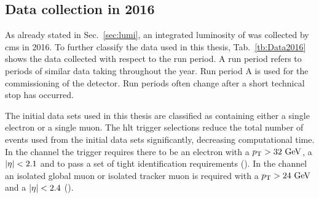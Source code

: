 
\subsection{Data collection in 2016} %
\label{sub:data_collection_in_2016}

As already stated in Sec.~\ref{sec:lumi}, an integrated luminosity of \Lumi{} was collected by \acrshort{cms} in 2016.
To further classify the data used in this thesis, Tab.~\ref{tb:Data2016} shows the data collected with respect to the run period.
A run period refers to periods of similar data taking throughout the year.
Run period A is used for the commissioning of the detector.
Run periods often change after a short technical stop has occurred.

The initial data sets used in this thesis are classified as containing either a single electron or a single muon.
The \acrshort{hlt} trigger selections reduce the total number of events used from the initial data sets significantly, decreasing computational time.
In the \eJets{} channel the trigger requires there to be an electron with a $p_{\mathrm{T}}>32\mathrm{~Ge\hspace{-.08em}V}^{}$, a $\lvert \eta \rvert<2.1$ and to pass a set of tight identification requirements (\eTrigger{}).
In the \muJets{} channel an isolated global muon or isolated tracker muon is required with a $p_{\mathrm{T}} > 24\mathrm{~Ge\hspace{-.08em}V}^{}$ and a $\lvert \eta \rvert < 2.4$ (\muTrigger{}).




